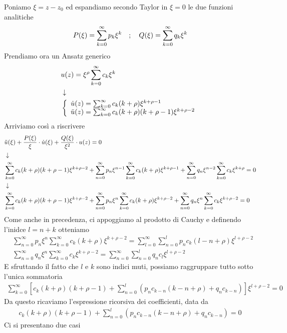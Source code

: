 Poniamo $\xi = z-z_0$ ed espandiamo secondo Taylor in $\xi = 0$ le due funzioni analitiche
\begin{align}
	P(\xi) = \sum_{k = 0}^{\infty} p_k \xi^k \quad ; \quad Q(\xi) = \sum_{k = 0}^{\infty} q_k \xi^k
\end{align}
Prendiamo ora un Ansatz generico
\begin{align}
	&u(z) = \xi^\rho \sum_{k=0}^{\infty} c_k \xi^k \firstpassage
	&\double{\dot{u}(z) = \sum_{k=0}^{\infty} c_k (k+\rho)\xi^{k+\rho-1}\hfill}{\ddot{u}(z) = \sum_{k=0}^{\infty} c_k (k+\rho)(k+\rho-1)\xi^{k+\rho-2}}
\end{align}
Arriviamo così a riscrivere
\begin{align}
	&\ddot{u}(\xi) + \frac{P(\xi)}{\xi} \cdot \dot{u}(\xi) + \frac{Q(\xi)}{\xi^2} \cdot u(z) = 0 \\ &\downarrow \nonumber \\
	&\sum_{k=0}^{\infty} c_k (k+\rho)(k+\rho-1)\xi^{k+\rho-2} + \sum_{n = 0}^{\infty} p_n \xi^{n-1} \sum_{k=0}^{\infty} c_k (k+\rho)\xi^{k+\rho-1} + \sum_{n = 0}^{\infty} q_n \xi^{n-2}\sum_{k=0}^{\infty} c_k \xi^{k+\rho} = 0 \nonumber \\ &\downarrow \nonumber \\
	&\sum_{k=0}^{\infty} c_k (k+\rho)(k+\rho-1)\xi^{k+\rho-2} + \sum_{n = 0}^{\infty} p_n \xi^n \sum_{k = 0}^{\infty} c_k (k+\rho)\xi^{k+\rho -2} + \sum_{n = 0}^{\infty} q_n \xi^n \sum_{k = 0}^{\infty} c_k \xi^{k+\rho -2} = 0
\end{align}
\newpage
Come anche in precedenza, ci appoggiamo al prodotto di Cauchy e definendo l'inidce $l = n+k$ otteniamo
\begin{align}
	&\sum_{n = 0}^{\infty} p_n \xi^n \sum_{k = 0}^{\infty} c_k (k+\rho)\xi^{k+\rho -2} = \sum_{l = 0}^{\infty} \sum_{n = 0}^{l} p_n c_k (l-n+\rho)\xi^{l+\rho -2}\\
	&\sum_{n = 0}^{\infty} q_n \xi^n \sum_{k = 0}^{\infty} c_k \xi^{k+\rho -2} = \sum_{n = 0}^{\infty}\sum_{n = 0}^{l} q_n c_l \xi^{l+\rho -2}
\end{align}
E sfruttando il fatto che $l$ e $k$ sono indici muti, possiamo raggruppare tutto sotto l'unica sommatoria
\begin{align}
	\sum_{k = 0}^\infty \left[ c_k (k+\rho)(k+\rho-1) + \sum_{n = 0}^{l} \left( p_n c_{k-n} (k-n+\rho) + q_n c_{k-n} \right) \right] \xi^{l+\rho -2} = 0
\end{align}
Da questo ricaviamo l'espressione ricorsiva dei coefficienti, data da
\begin{align}
	c_k (k+\rho)(k+\rho-1) + \sum_{n = 0}^{l} \left( p_n c_{k-n} (k-n+\rho) + q_n c_{k-n} \right) = 0 \label{ricors}
\end{align}
Ci si presentano due casi
